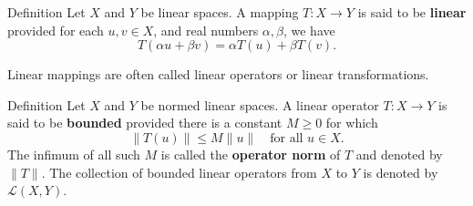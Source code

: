 \begin{namedthm*}{Definition}
    Let $X$ and $Y$ be linear spaces.
    A mapping $T:X\to Y$ is said to be \textbf{linear} provided for each $u,v\in X$, and real numbers $\alpha,\beta$, we have
    \[
        T(\alpha u+\beta v)=\alpha T(u)+\beta T(v).
    \]
\end{namedthm*}
Linear mappings are often called linear operators or linear transformations.
\begin{namedthm*}{Definition}
    Let $X$ and $Y$ be normed linear spaces.
    A linear operator $T:X\to Y$ is said to be \textbf{bounded} provided there is a constant $M\ge0$ for which 
    \[
        \|T(u)\|\le M\|u\|\quad\text{for all }u\in X.
    \]
    The infimum of all such $M$ is called the \textbf{operator norm} of $T$ and denoted by $\|T\|$.
    The collection of bounded linear operators from $X$ to $Y$ is denoted by $\mathcal{L}(X,Y)$.
\end{namedthm*}

